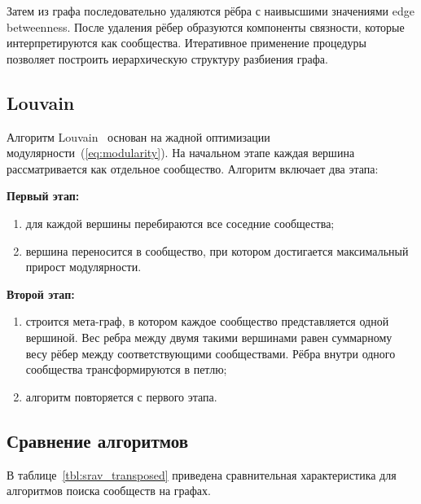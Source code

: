 Затем из графа последовательно удаляются рёбра с наивысшими значениями edge betweenness. После удаления рёбер образуются компоненты связности, которые интерпретируются как сообщества. Итеративное применение процедуры позволяет построить иерархическую структуру разбиения графа.

\subsection{Louvain}

Алгоритм Louvain~\cite{louv} основан на жадной оптимизации модулярности~(\ref{eq:modularity}). На начальном этапе каждая вершина рассматривается как отдельное сообщество. Алгоритм включает два этапа:

\textbf{Первый этап:}
\begin{enumerate}
	\item для каждой вершины перебираются все соседние сообщества;
	\item вершина переносится в сообщество, при котором достигается максимальный прирост модулярности.
\end{enumerate}

\textbf{Второй этап:}
\begin{enumerate}
	\item строится мета-граф, в котором каждое сообщество представляется одной вершиной. Вес ребра между двумя такими вершинами равен суммарному весу рёбер между соответствующими сообществами. Рёбра внутри одного сообщества трансформируются в петлю;
	\item алгоритм повторяется с первого этапа.
\end{enumerate}

\subsection{Сравнение алгоритмов}

В таблице~\ref{tbl:srav_transposed} приведена сравнительная характеристика для алгоритмов поиска сообществ на графах.

